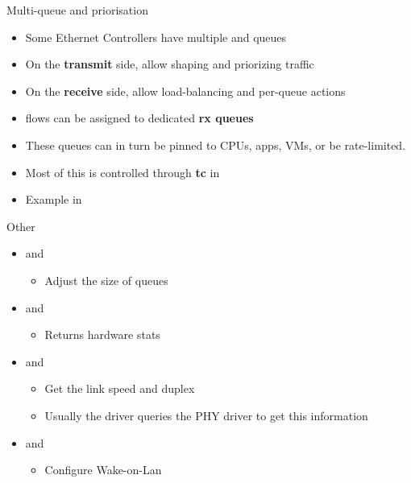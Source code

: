 \begin{frame}{Multi-queue and priorisation}
	\begin{itemize}
		\item Some Ethernet Controllers have multiple  and queues
		\item On the \textbf{transmit} side, allow shaping and priorizing traffic
		\item On the \textbf{receive} side, allow load-balancing and per-queue actions
		\item flows can be assigned to dedicated \textbf{rx queues}
		\item These queues can in turn be pinned to CPUs, apps, VMs, or be rate-limited.
		\item Most of this is controlled through \textbf{tc} in 
		\item Example in 
	\end{itemize}
\end{frame}

\begin{frame}{Other }
	\begin{itemize}
		\item {} and 
			\begin{itemize}
				\item Adjust the size of queues
			\end{itemize}
		\item {} and 
			\begin{itemize}
				\item Returns hardware stats
			\end{itemize}
		\item {} and 
			\begin{itemize}
				\item Get the link speed and duplex
				\item Usually the driver queries the PHY driver to get this information
			\end{itemize}
		\item {} and 
			\begin{itemize}
				\item Configure Wake-on-Lan
			\end{itemize}
	\end{itemize}
\end{frame}


